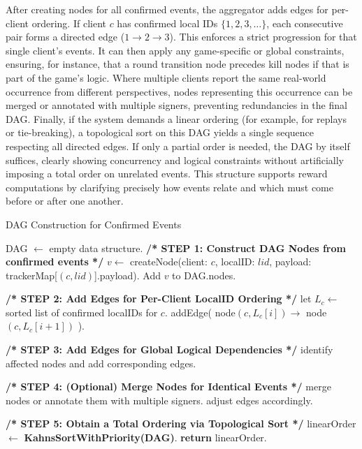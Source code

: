 \documentclass[11pt]{article}
\begin{document}
After creating nodes for all confirmed events, the aggregator adds edges for per-client ordering. If client \(c\) has confirmed local IDs \(\{1, 2, 3,\dots\}\), each consecutive pair forms a directed edge (\(1 \to 2 \to 3\)). This enforces a strict progression for that single client’s events. It can then apply any game-specific or global constraints, ensuring, for instance, that a round transition node precedes kill nodes if that is part of the game’s logic. Where multiple clients report the same real-world occurrence from different perspectives, nodes representing this occurrence can be merged or annotated with multiple signers, preventing redundancies in the final DAG. Finally, if the system demands a linear ordering (for example, for replays or tie-breaking), a topological sort on this DAG yields a single sequence respecting all directed edges. If only a partial order is needed, the DAG by itself suffices, clearly showing concurrency and logical constraints without artificially imposing a total order on unrelated events. This structure supports reward computations by clarifying precisely how events relate and which must come before or after one another.


\begin{algorithm}[H]
\scriptsize
\caption{DAG Construction for Confirmed Events}
\label{algo:dagConstruction}
\begin{algorithmic}[1]
  \State DAG $\gets$ empty data structure.
  \State \textbf{/* STEP 1: Construct DAG Nodes from confirmed events */}
    \State $v \gets$ createNode(client: $c$, localID: $lid$, payload: trackerMap[$(c,lid)$].payload).
    \State Add $v$ to DAG.nodes.
  \EndFor

  \State \textbf{/* STEP 2: Add Edges for Per-Client LocalID Ordering */}
    \State let $L_c \gets$ sorted list of confirmed localIDs for $c$.
      \State addEdge( node$(c, L_c[i]) \to$ node$(c, L_c[i+1])$ ).
    \EndFor
  \EndFor

  \State \textbf{/* STEP 3: Add Edges for Global Logical Dependencies */}
    \State identify affected nodes and add corresponding edges.
  \EndFor

  \State \textbf{/* STEP 4: (Optional) Merge Nodes for Identical Events */}
    \State merge nodes or annotate them with multiple signers.
    \State adjust edges accordingly.
  \EndFor

  \State \textbf{/* STEP 5: Obtain a Total Ordering via Topological Sort */}
  \State linearOrder $\gets$ \textbf{KahnsSortWithPriority(DAG)}.
  \State \textbf{return} linearOrder.
\EndProcedure
\end{algorithmic}
\end{algorithm}
\end{document}
